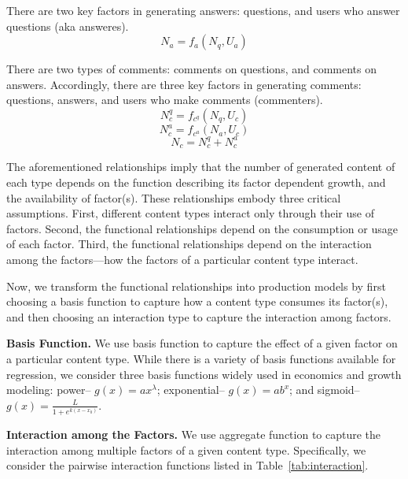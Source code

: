 There are two key factors in generating answers: questions, and users who answer questions (aka answeres). 
\begin{equation*}
N_a = f_a(N_q, U_a)
\end{equation*}

There are two types of comments: comments on questions, and comments on answers. Accordingly, there are three key factors in generating comments: questions, answers, and users who make comments (commenters). 
\begin{equation*}
N_c^q = f_{c^q}(N_q, U_c)
\end{equation*}
\begin{equation*}
N_c^a = f_{c^a}(N_a, U_c)
\end{equation*}
\begin{equation*}
N_c = N_c^q + N_c^a
\end{equation*}

The aforementioned relationships imply that the number of generated content of each type depends on the function describing its factor dependent growth, and the availability of factor(s). These relationships embody three critical assumptions. First, different content types interact only through their use of factors. Second, the functional relationships depend on the consumption or usage of each factor. Third, the functional relationships depend on the interaction among the factors---how the factors of a particular content type interact. 

Now, we transform the functional relationships into production models by first choosing a basis function to capture how a content type consumes its factor(s), and then choosing an interaction type to capture the interaction among factors.

\textbf{Basis Function.} We use basis function to capture the effect of a given factor on a particular content type. While there is a variety of basis functions available for regression, we consider three basis functions widely used in economics and growth modeling: power-- $g(x) = ax^{\lambda}$; exponential-- $g(x) = ab^x$; and sigmoid-- $g(x) = \frac{L}{1+e^{k(x-x_0)}}$. 

\textbf{Interaction among the Factors.} We use aggregate function to capture the interaction among multiple factors of a given content type. Specifically, we consider the pairwise interaction functions listed in Table~\ref{tab:interaction}. 

